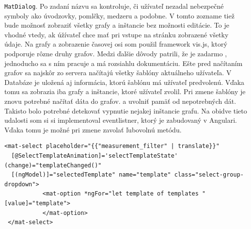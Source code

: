 \documentclass[11pt, oneside]{report}
\begin{document}
\lstinline!MatDialog!. Po zadaní názvu sa kontroluje, či užívateľ nezadal nebezpečné symboly ako úvodzovky, pomlčky, medzeru  a podobne. V  tomto zozname tiež bude možnosť zobraziť všetky grafy a inštancie bez možnosti editácie. To je vhodné vtedy, ak úžívateľ chce mať pri vstupe na stránku zobrazené všetky údaje.  Na grafy a zobrazenie časovej osi som použil framework vis.js, ktorý podporuje rôzne druhy grafov. Medzi ďalšie dôvody patrili, že je zadarmo , jednoducho sa s ním pracuje a má rozsiahlu dokumentáciu.  Ešte pred načítaním grafov sa  najskôr zo servera načítajú všetky šablóny aktuálneho užívateľa. V Databáze je uložená aj informácia, ktorú šablónu má užívateľ predvolenú. Vďaka tomu sa zobrazia iba grafy a inštancie, ktoré užívateľ zvolil. Pri zmene  šablóny je znovu potrebné načítať dáta do grafov. a uvolniť pamäť od nepotrebných dát. Takisto bolo potrebné detekovať vypnutie nejakej inštancie grafu. Na obidve tieto udalosti som si si implementoval eventlistner, ktorý je zabudovaný v Angulari. Vďaka tomu je možné pri zmene zavolať ľubovolnú metódu. 
\lstset{language=HTML5}
\begin{lstlisting}[showstringspaces=false,caption=Dropdown pre zvolenie šablóny s využitím Two-way databinding,captionpos=b]
 <mat-select placeholder="{{"measurement_filter" | translate}}"
  [@SelectTemplateAnimation]='selectTemplateState' (change)="templateChanged()"
  [(ngModel)]="selectedTemplate" name="template" class="select-group-dropdown">
           <mat-option *ngFor="let template of templates " [value]="template">               
           </mat-option>
 </mat-select>
\end{lstlisting}
\end{document}
